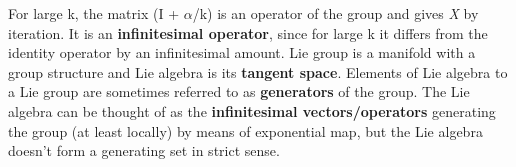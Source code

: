 For large k, the matrix (I + $\alpha$/k) is an operator of the group and gives \textit{X} by iteration. 
It is an \textbf{infinitesimal operator}, since for large k it diﬀers from the identity operator by an inﬁnitesimal amount.
Lie group is a manifold with a group structure and Lie algebra is its \textbf{tangent space}.
Elements of Lie algebra to a Lie group are sometimes referred to as \textbf{generators} of the group.
The Lie algebra can be thought of as the \textbf{infinitesimal vectors/operators} generating the group (at least locally) by means of
exponential map, but the Lie algebra doesn't form a generating set in strict sense.

\newpage
